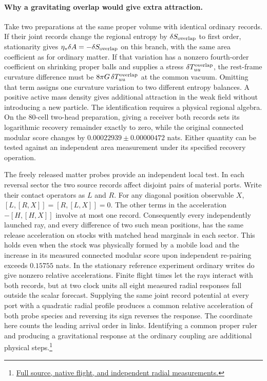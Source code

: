\documentclass[11pt]{article}
\begin{document}
\paragraph{Why a gravitating overlap would give extra attraction.}
Take two preparations at the same proper volume with identical ordinary
records. If their joint records change the regional entropy by
$\delta S_{\rm overlap}$ to first order, stationarity gives
$\eta_*\delta A=-\delta S_{\rm overlap}$ on this branch, with the
same area coefficient as for ordinary matter. If that variation has a
nonzero fourth-order coefficient on shrinking proper balls and supplies
a stress $\delta T^{\rm overlap}_{uu}$, the rest-frame curvature
difference must be $8\pi G\,\delta T^{\rm overlap}_{uu}$ at the common
vacuum. Omitting that term assigns one curvature variation to two
different entropy balances. A positive active mass density gives
additional attraction in the weak field without introducing a new
particle. The identification requires a physical regional algebra.
On the 80-cell two-head preparation, giving a receiver both records
sets its logarithmic recovery remainder exactly to zero, while the
original connected modular score changes by
$0.00022939\pm0.00000472$ nats. Either quantity can be tested against
an independent area measurement under its specified recovery operation.

The freely released matter probes provide an independent local test.
In each reversal sector the two source records affect disjoint pairs of
material ports. Write their contact operators as $L$ and $R$.
For any diagonal position observable $X$,
$[L,[R,X]]=[R,[L,X]]=0$. The other terms in the acceleration
$-[H,[H,X]]$ involve at most one record. Consequently every independently
launched ray, and every difference of two such mean positions, has the
same release acceleration on stocks with matched head marginals in
each sector. This holds even when the stock was physically formed by
a mobile load and the increase in its measured connected modular
score upon independent re-pairing exceeds $0.15755$ nats. In the
stationary reference experiment ordinary writes do give nonzero
relative accelerations. Finite flight times let the rays interact
with both records, but at two clock units all eight measured radial
responses fall outside the scalar forecast. Supplying the same joint
record potential at every port with a quadratic radial profile produces
a common relative acceleration of both probe species and reversing its
sign reverses the response. The coordinate here counts
the leading arrival order in links. Identifying a common proper ruler
and producing a gravitational response at the ordinary coupling are
additional physical steps.\footnote{\href{https://github.com/FloatingPragma/observer-patch-holography/tree/main/openwave/interval_echo/row_19/recovery_identity}{Full source, native flight, and independent radial measurements.}}
\end{document}
